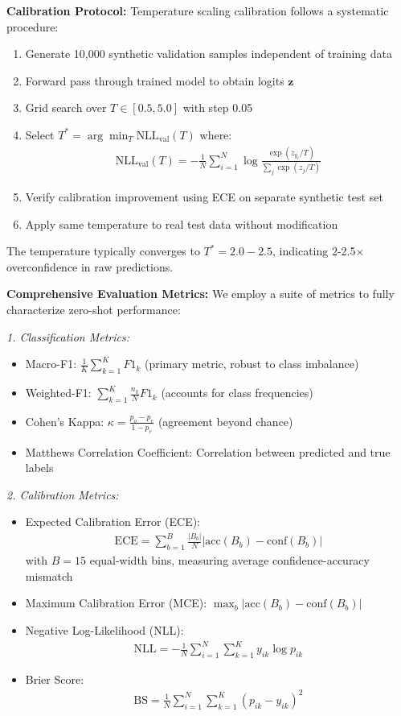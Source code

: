 \documentclass[journal]{IEEEtran}
\begin{document}
\textbf{Calibration Protocol:}
Temperature scaling calibration follows a systematic procedure:
\begin{enumerate}
\item Generate 10,000 synthetic validation samples independent of training data
\item Forward pass through trained model to obtain logits $\mathbf{z}$
\item Grid search over $T \in [0.5, 5.0]$ with step 0.05
\item Select $T^* = \arg\min_T \text{NLL}_{\text{val}}(T)$ where:
\begin{align}
\text{NLL}_{\text{val}}(T) = -\frac{1}{N} \sum_{i=1}^N \log \frac{\exp(z_{y_i}/T)}{\sum_j \exp(z_j/T)}
\end{align}
\item Verify calibration improvement using ECE on separate synthetic test set
\item Apply same temperature to real test data without modification
\end{enumerate}

The temperature typically converges to $T^* = 2.0-2.5$, indicating 2-2.5× overconfidence in raw predictions.

\textbf{Comprehensive Evaluation Metrics:}
We employ a suite of metrics to fully characterize zero-shot performance:

\textit{1. Classification Metrics:}
\begin{itemize}
\item Macro-F1: $\frac{1}{K} \sum_{k=1}^K F1_k$ (primary metric, robust to class imbalance)
\item Weighted-F1: $\sum_{k=1}^K \frac{n_k}{N} F1_k$ (accounts for class frequencies)
\item Cohen's Kappa: $\kappa = \frac{p_o - p_e}{1 - p_e}$ (agreement beyond chance)
\item Matthews Correlation Coefficient: Correlation between predicted and true labels
\end{itemize}

\textit{2. Calibration Metrics:}
\begin{itemize}
\item Expected Calibration Error (ECE): 
\begin{align}
\text{ECE} = \sum_{b=1}^{B} \frac{|B_b|}{N} |\text{acc}(B_b) - \text{conf}(B_b)|
\end{align}
with $B=15$ equal-width bins, measuring average confidence-accuracy mismatch

\item Maximum Calibration Error (MCE): $\max_b |\text{acc}(B_b) - \text{conf}(B_b)|$

\item Negative Log-Likelihood (NLL): 
\begin{align}
\text{NLL} = -\frac{1}{N} \sum_{i=1}^N \sum_{k=1}^K y_{ik} \log p_{ik}
\end{align}

\item Brier Score: 
\begin{align}
\text{BS} = \frac{1}{N} \sum_{i=1}^N \sum_{k=1}^K (p_{ik} - y_{ik})^2
\end{align}
\end{itemize}
\end{document}
